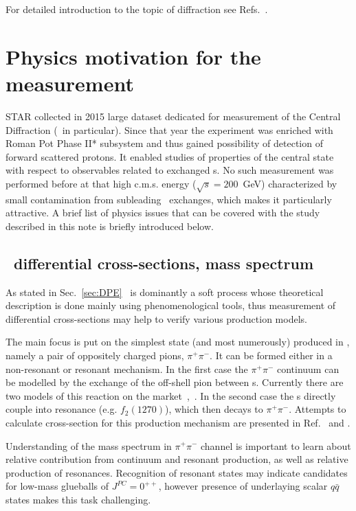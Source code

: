 For detailed introduction to the topic of diffraction see Refs.~\cite{pomeronAndQCD,barone}.%

\section{Physics motivation for the measurement}
STAR collected in 2015 large dataset dedicated for measurement of the Central Diffraction (\DPE\ in particular). Since that year the experiment was enriched with Roman Pot Phase II* subsystem and thus gained possibility of detection of forward scattered protons. It enabled studies of properties of the central state with respect to observables related to exchanged \Pomeron s. No such measurement was performed before at that high c.m.s. energy ($\sqrt{s}=200$~GeV) characterized by small contamination from subleading \Reggeon\ exchanges, which makes it particularly attractive. A brief list of physics issues that can be covered with the study described in this note is briefly introduced below.\vspace{-3pt}%
%
\subsection{\DPE\ differential cross-sections, mass spectrum}

As stated in Sec.~\ref{sec:DPE} \DPE\ is dominantly a soft process whose theoretical description is done mainly using phenomenological tools, thus measurement of differential cross-sections may help to verify various production models.

The main focus is put on the simplest state (and most numerously) produced in \DPE, namely a pair of oppositely charged pions, $\pi^{+}\pi^{-}$. It can be formed either in a non-resonant or resonant mechanism. In the first case the $\pi^{+}\pi^{-}$ continuum can be modelled by the exchange of the off-shell pion between \Pomeron s. Currently there are two models of this reaction on the market~\cite{LSmodel,LSmodel2},~\cite{DurhamModel}. In the second case the \Pomeron s directly couple into resonance (e.g. $f_{2}(1270)$), which then decays to $\pi^{+}\pi^{-}$. Attempts to calculate cross-section for this production mechanism are presented in Ref.~\cite{LSmodel2} and \cite{Schicker}.

Understanding of the mass spectrum in $\pi^{+}\pi^{-}$ channel is important to learn about relative contribution from continuum and resonant production, as well as relative production of resonances. Recognition of resonant states may indicate candidates for low-mass glueballs of $J^{PC}=0^{++}$, however presence of underlaying scalar $q\bar{q}$ states makes this task challenging.

